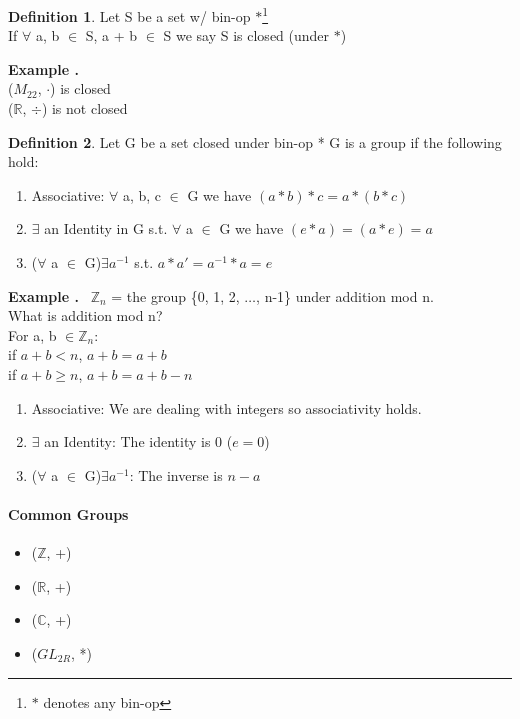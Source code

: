 \documentclass{article}
\newcounter{example}
\newcounter{solution}
\theoremstyle{definition}
\newtheorem{definition}{Definition}[section]
\theoremstyle{claim}
\theoremstyle{remark}
\theoremstyle{theorem}
\newcommand\Example{%
  \stepcounter{example}%
  \textbf{Example \theexample.}~%
  \setcounter{solution}{0}%
}
\begin{document}
\begin{flushleft}
\begin{definition}{Let S be a set w/ bin-op $*$\footnote{$*$ denotes any bin-op}}\\
If $\forall$ a, b $\in$ S, a + b $\in$ S we say S is closed (under $*$)
\end{definition}
\Example                            \\
($M_{22}$, $\cdot$) is closed       \\
($\mathbb{R}$, $\div$) is not closed\\
\begin{definition}{Let G be a set closed under bin-op *}
G is a group if the following hold:
\begin{enumerate}
  \item Associative: $\forall$ a, b, c $\in$ G we have $(a * b) * c = a * (b * c)$
  \item $\exists$ an Identity in G s.t. $\forall$ a $\in$ G we have $(e * a) = (a * e) = a$
  \item ($\forall$ a $\in$ G)$\exists a^{-1}$ s.t. $a * a\prime = a^{-1} * a = e$
\end{enumerate}
\end{definition}
\Example $\mathbb{Z}_{n}$ = the group \{0, 1, 2, $\dots$, n-1\} under addition mod n.\\
What is addition mod n?\newline \\
For a, b $\in \mathbb{Z}_{n}$:  \\
if $a + b < n$, $a + b = a + b$ \\
if $a + b \geq n$, $a + b = a + b - n$\newline\\

\begin{enumerate}
  \item Associative: We are dealing with integers so associativity holds.
  \item $\exists$ an Identity: The identity is 0 ($e = 0$) 
  \item ($\forall$ a $\in$ G)$\exists a^{-1}$: The inverse is $n - a$
\end{enumerate}

\paragraph{Common Groups}
\begin{itemize}
  \item ($\mathbb{Z}$, +)
  \item ($\mathbb{R}$, +)
  \item ($\mathbb{C}$, +)
  \item ($GL_{2R}$, *)
\end{itemize}


\end{flushleft}
\end{document}
